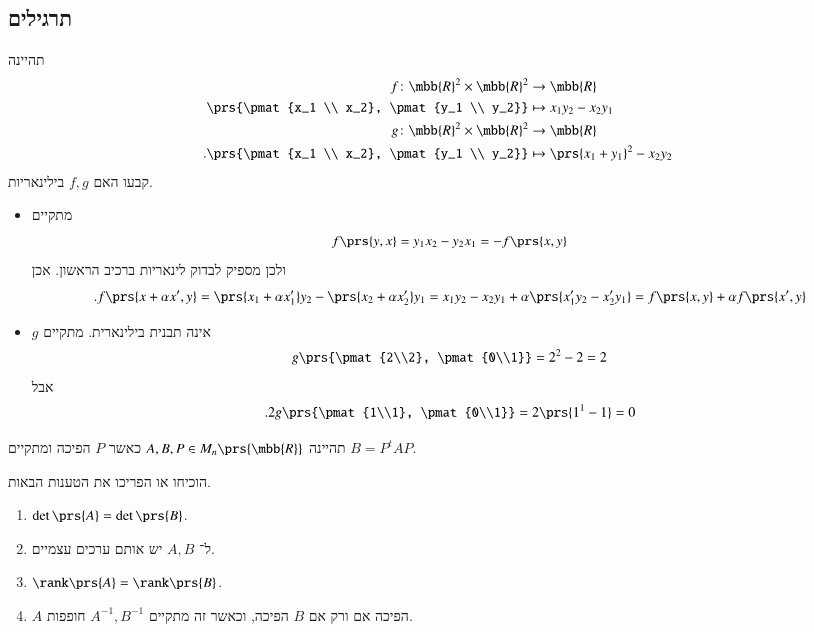 \documentclass[a4paper,10pt,oneside,openany]{article}
\begin{document}
\subsection{תרגילים}

\begin{exercise}
תהיינה
\begin{align*}
f \colon \mbb{R}^2 \times \mbb{R}^2 &\to \mbb{R} \\
\prs{\pmat{x_1 \\ x_2}, \pmat{y_1 \\ y_2}} &\mapsto x_1 y_2 - x_2 y_1 \\
g \colon \mbb{R}^2 \times \mbb{R}^2 &\to \mbb{R} \\
\text{.} \prs{\pmat{x_1 \\ x_2}, \pmat{y_1 \\ y_2}} &\mapsto \prs{x_1 + y_1}^2 - x_2 y_2
\end{align*}
קבעו האם
$f,g$
בילינאריות.
\end{exercise}

\begin{solution}
\begin{itemize}
\item מתקיים
\[f\prs{y,x} = y_1 x_2 - y_2 x_1 = -f\prs{x,y}\]
ולכן מספיק לבדוק לינאריות ברכיב הראשון.
אכן
\[\text{.} f\prs{x + \alpha x', y} = \prs{x_1 + \alpha x_1'} y_2 - \prs{x_2 + \alpha x_2'} y_1 = x_1 y_2 - x_2 y_1 + \alpha\prs{x_1' y_2 - x_2' y_1} = f\prs{x,y} + \alpha f\prs{x',y}\]

\item $g$
אינה תבנית בילינארית.
מתקיים
\[g\prs{\pmat{2\\2}, \pmat{0\\1}} = 2^2 - 2 = 2\]
אבל
\[\text{.} 2g\prs{\pmat{1\\1}, \pmat{0\\1}} = 2\prs{1^1 - 1} = 0\]
\end{itemize}
\end{solution}

\begin{exercise}
תהיינה
$A,B,P \in M_n\prs{\mbb{R}}$
כאשר
$P$
הפיכה ומתקיים
$B = P^t A P$.

הוכיחו או הפריכו את הטענות הבאות.
\begin{enumerate}
\item $\det\prs{A} = \det\prs{B}$.
\item ל־%
$A,B$
יש אותם ערכים עצמיים.
\item $\rank\prs{A} = \rank\prs{B}$.
\item $A$
הפיכה אם ורק אם
$B$
הפיכה, וכאשר זה מתקיים
$A^{-1}, B^{-1}$
חופפות.
\end{enumerate}
\end{exercise}
\end{document}
